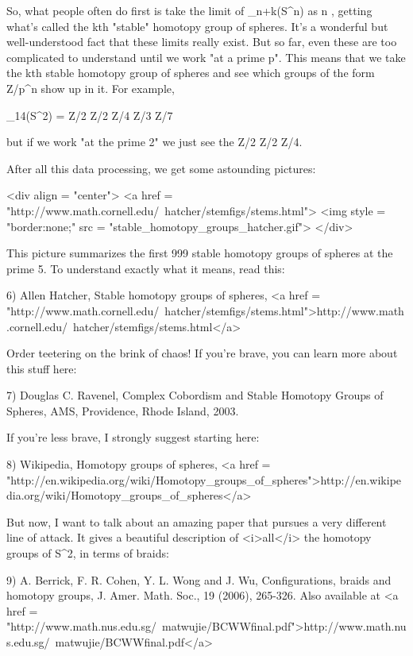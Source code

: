 So, what people often do first is take the limit of
\pi _{n+k}(S^{n}) as n \to  \infty , getting what's
called the kth "stable" homotopy group of spheres.  It's a
wonderful but well-understood fact that these limits really exist.
But so far, even these are too complicated to understand until we work
"at a prime p".  This means that we take the kth stable
homotopy group of spheres and see which groups of the form Z/p^{n} show
up in it.  For example,

\pi _{14}(S^{2}) = Z/2 \times  Z/2 \times  Z/4 \times  Z/3 \times  Z/7

but if we work "at the prime 2" we just see the Z/2 \times  Z/2 \times  Z/4.

After all this data processing, we get some astounding pictures:

<div align = "center">
<a href = "http://www.math.cornell.edu/~hatcher/stemfigs/stems.html">
<img style = "border:none;" src = "stable_homotopy_groups_hatcher.gif">
</div>

This picture summarizes the first 999 stable homotopy groups of 
spheres at the prime 5.  To understand exactly what it means, read this:

6) Allen Hatcher, Stable homotopy groups of spheres,
<a href = "http://www.math.cornell.edu/~hatcher/stemfigs/stems.html">http://www.math.cornell.edu/~hatcher/stemfigs/stems.html</a>

Order teetering on the brink of chaos!  If you're brave, you can
learn more about this stuff here:

7) Douglas C. Ravenel, Complex Cobordism and Stable Homotopy Groups
of Spheres, AMS, Providence, Rhode Island, 2003.

If you're less brave, I strongly suggest starting here:

8) Wikipedia, Homotopy groups of spheres, 
<a href = "http://en.wikipedia.org/wiki/Homotopy_groups_of_spheres">http://en.wikipedia.org/wiki/Homotopy_groups_of_spheres</a>

But now, I want to talk about an amazing paper that pursues a
very different line of attack.  It gives a beautiful description 
of <i>all</i> the homotopy groups of S^{2}, in terms of braids:

9) A. Berrick, F. R. Cohen, Y. L. Wong and J. Wu, Configurations, 
braids and homotopy groups, J. Amer. Math. Soc., 19 (2006), 265-326.
Also available at <a href = "http://www.math.nus.edu.sg/~matwujie/BCWWfinal.pdf">http://www.math.nus.edu.sg/~matwujie/BCWWfinal.pdf</a>


